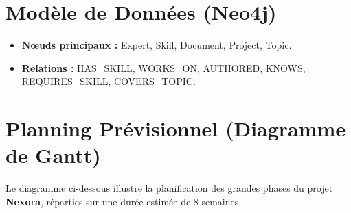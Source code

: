 \documentclass[12pt,a4paper]{article}
\begin{document}
\section{Modèle de Données (Neo4j)}

\begin{itemize}[leftmargin=*]
    \item \textbf{Nœuds principaux :} Expert, Skill, Document, Project, Topic.
    \item \textbf{Relations :} HAS\_SKILL, WORKS\_ON, AUTHORED, KNOWS, REQUIRES\_SKILL, COVERS\_TOPIC.
\end{itemize}

\section{Planning Prévisionnel (Diagramme de Gantt)}

Le diagramme ci-dessous illustre la planification des grandes phases du projet \textbf{Nexora}, réparties sur une durée estimée de 8 semaines.
\end{document}
